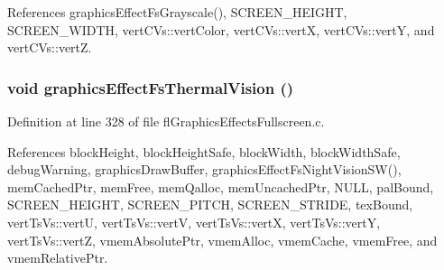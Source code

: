 References graphics\-Effect\-Fs\-Grayscale(), SCREEN\_\-HEIGHT, SCREEN\_\-WIDTH, vert\-CVs::vert\-Color, vert\-CVs::vert\-X, vert\-CVs::vert\-Y, and vert\-CVs::vert\-Z.
\subsubsection{\setlength{\rightskip}{0pt plus 5cm}void graphics\-Effect\-Fs\-Thermal\-Vision ()}\label{flGraphicsEffectsFullscreen_8c_1a90fa1f7c7ce5255ec19fd152b41fc4}




Definition at line 328 of file fl\-Graphics\-Effects\-Fullscreen.c.

References block\-Height, block\-Height\-Safe, block\-Width, block\-Width\-Safe, debug\-Warning, graphics\-Draw\-Buffer, graphics\-Effect\-Fs\-Night\-Vision\-SW(), mem\-Cached\-Ptr, mem\-Free, mem\-Qalloc, mem\-Uncached\-Ptr, NULL, pal\-Bound, SCREEN\_\-HEIGHT, SCREEN\_\-PITCH, SCREEN\_\-STRIDE, tex\-Bound, vert\-Ts\-Vs::vert\-U, vert\-Ts\-Vs::vert\-V, vert\-Ts\-Vs::vert\-X, vert\-Ts\-Vs::vert\-Y, vert\-Ts\-Vs::vert\-Z, vmem\-Absolute\-Ptr, vmem\-Alloc, vmem\-Cache, vmem\-Free, and vmem\-Relative\-Ptr.